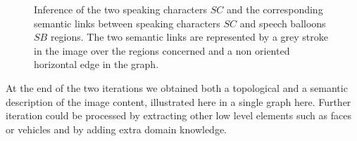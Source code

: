  \begin{figure}[!ht]  %
   \centering
   \hspace{0.5em}
  \caption[Inference of the speaking characters $SC$ and the corresponding semantic links between speaking characters $SC$ and speech balloons $SB$ regions]{Inference of the two speaking characters $SC$ and the corresponding semantic links between speaking characters $SC$ and speech balloons $SB$ regions.
  The two semantic links are represented by a grey stroke in the image over the regions concerned and a non oriented horizontal edge in the graph.
  }
  \label{fig:kn:final_information}
 \end{figure}

At the end of the two iterations we obtained both a topological and a semantic description of the image content, illustrated here in a single graph here.
Further iteration could be processed by extracting other low level elements such as faces or vehicles and by adding extra domain knowledge.


